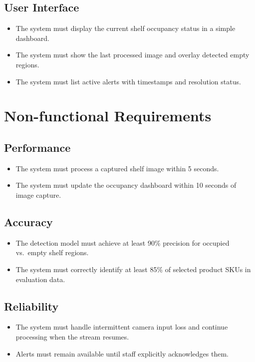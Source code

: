 \subsection{User Interface}
\begin{itemize}
    \item The system must display the current shelf occupancy status in a simple dashboard.
    \item The system must show the last processed image and overlay detected empty regions.
    \item The system must list active alerts with timestamps and resolution status.
\end{itemize}

\section{Non-functional Requirements}

\subsection{Performance}
\begin{itemize}
    \item The system must process a captured shelf image within 5 seconds.
    \item The system must update the occupancy dashboard within 10 seconds of image capture.
\end{itemize}

\subsection{Accuracy}
\begin{itemize}
    \item The detection model must achieve at least 90\% precision for occupied vs.\ empty shelf regions.
    \item The system must correctly identify at least 85\% of selected product SKUs in evaluation data.
\end{itemize}

\subsection{Reliability}
\begin{itemize}
    \item The system must handle intermittent camera input loss and continue processing when the stream resumes.
    \item Alerts must remain available until staff explicitly acknowledges them.
\end{itemize}

